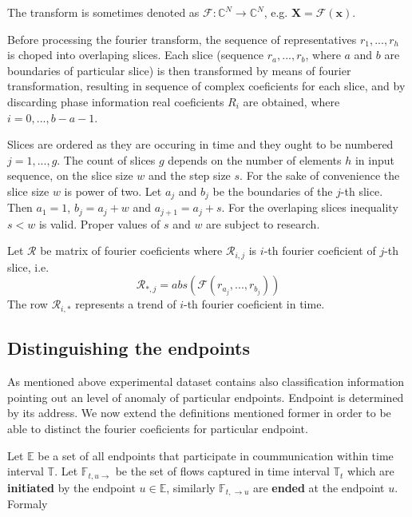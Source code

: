 \documentclass[a4paper]{IEEEtran}
\begin{document}
The transform is sometimes denoted as 
$\mathcal{F}\colon\mathbb{C}^N \to \mathbb{C}^N$, e.g.
$\mathbf{X} = \mathcal{F} \left ( \mathbf{x} \right )$.

Before processing the fourier transform, the sequence of representatives 
$r_1, ...,r_h$ is choped into overlaping slices.
Each slice (sequence $r_a, ..., r_b$, where $a$ and $b$ are boundaries
of particular slice) is then transformed by means of fourier transformation,
resulting in sequence of complex coeficients for each slice,
and by discarding phase information real coeficients ${R}_i$ are obtained,
where $i = 0, ..., b-a-1$.

Slices are ordered as they are occuring in time and they ought to be numbered
$j = 1,..., g $. The count of slices $g$ depends on the number of elements $h$
in input sequence, on the slice size $w$ and the step size $s$.
For the sake of convenience the slice size $w$ is power of two.
Let $a_j$ and $b_j$ be the boundaries of the $j$-th slice. Then
$a_1 = 1$, $b_j = a_j + w$ and $a_{j+1} = a_j + s$.
For the overlaping slices inequality $s < w$ is valid.
Proper values of $s$ and $w$ are subject to research.

Let $\mathcal{R}$ be matrix of fourier coeficients where
$\mathcal{R}_{i,j}$ is $i$-th fourier coeficient of $j$-th slice,
i.e. 
\begin{equation}
\mathcal{R}_{*,j} = abs(\mathcal{F}(r_{a_j}, ..., r_{b_j}))
\end{equation}
The row $\mathcal{R}_{i,*}$ represents a trend of $i$-th fourier
coeficient in time.

\subsection{Distinguishing the endpoints}
As mentioned above experimental dataset contains also
classification information pointing out an level of anomaly of 
particular endpoints. Endpoint is determined by its address.
We now extend the definitions mentioned
former in order to be able to distinct the fourier coeficients for
particular endpoint.

Let $\mathbb{E}$ be a set of all endpoints that
participate in coummunication within time interval $\mathbb{T}$.
Let $\mathbb{F}_{t,u \rightarrow}$ be the set of flows captured in
time interval $\mathbb{T}_{t}$ %
which are \textbf{initiated} by the endpoint $u \in \mathbb{E}$,
similarly $\mathbb{F}_{t, \rightarrow u}$ are \textbf{ended} at the
endpoint $u$. Formaly
\end{document}
